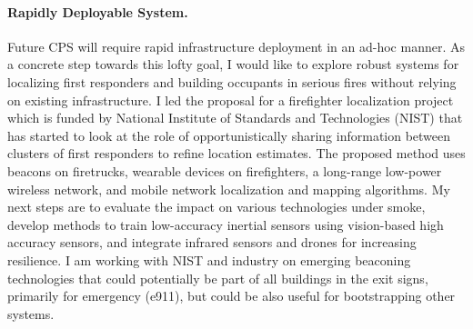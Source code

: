\documentclass[10pt]{article}
\begin{document}
\paragraph{Rapidly Deployable System. }
Future CPS will require rapid infrastructure deployment in an ad-hoc manner.  As a concrete step towards this lofty goal, I would like to explore robust systems for localizing first responders and building occupants in serious fires without relying on existing infrastructure. I led the proposal for a firefighter localization project which is funded by National Institute of Standards and Technologies (NIST) that has started to look at the role of opportunistically sharing information between clusters of first responders to refine location estimates.
The proposed method uses beacons on firetrucks, wearable devices on firefighters, a long-range low-power wireless network, and mobile network localization and mapping algorithms. 
My next steps are to evaluate the impact on various technologies under smoke, develop methods to train low-accuracy inertial sensors using vision-based high accuracy sensors, and integrate infrared sensors and drones for increasing resilience. I am working with NIST and industry on emerging beaconing technologies that could potentially be part of all buildings in the exit signs, primarily for emergency (e911), but could be also useful for bootstrapping other systems. 
 
\end{document}
